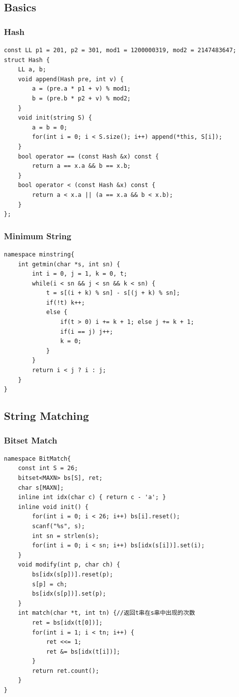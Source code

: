 \documentclass[10pt]{ctexart}
\begin{document}
{\subsection{Basics}
\subsubsection{Hash}
\begin{lstlisting}
const LL p1 = 201, p2 = 301, mod1 = 1200000319, mod2 = 2147483647;
struct Hash {
    LL a, b;
    void append(Hash pre, int v) {
        a = (pre.a * p1 + v) % mod1;
        b = (pre.b * p2 + v) % mod2;
    }
    void init(string S) {
        a = b = 0;
        for(int i = 0; i < S.size(); i++) append(*this, S[i]);
    }
    bool operator == (const Hash &x) const {
        return a == x.a && b == x.b;
    }
    bool operator < (const Hash &x) const {
        return a < x.a || (a == x.a && b < x.b);
    }
};
\end{lstlisting}
\subsubsection{Minimum String}
\begin{lstlisting}
namespace minstring{
	int getmin(char *s, int sn) {
		int i = 0, j = 1, k = 0, t;
		while(i < sn && j < sn && k < sn) {
			t = s[(i + k) % sn] - s[(j + k) % sn];
			if(!t) k++;
			else {
				if(t > 0) i += k + 1; else j += k + 1;
				if(i == j) j++;
				k = 0;
			}
		}
		return i < j ? i : j;
	}
}
\end{lstlisting}
\subsection{String Matching}
\subsubsection{Bitset Match}
\begin{lstlisting}
namespace BitMatch{
	const int S = 26;
	bitset<MAXN> bs[S], ret;
	char s[MAXN];
	inline int idx(char c) { return c - 'a'; }
	inline void init() {
		for(int i = 0; i < 26; i++) bs[i].reset();
		scanf("%s", s);
		int sn = strlen(s);
		for(int i = 0; i < sn; i++) bs[idx(s[i])].set(i);
	}
	void modify(int p, char ch) {
		bs[idx(s[p])].reset(p);
		s[p] = ch;
		bs[idx(s[p])].set(p);
	}
	int match(char *t, int tn) {//返回t串在s串中出现的次数
		ret = bs[idx(t[0])];
		for(int i = 1; i < tn; i++) {
			ret <<= 1;
			ret &= bs[idx(t[i])];
		}
		return ret.count();
	} 
}
\end{lstlisting}
}
\end{document}
